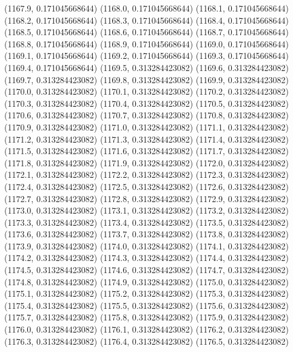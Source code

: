 {					(1167.9, 0.171045668644)
					(1168.0, 0.171045668644)
					(1168.1, 0.171045668644)
					(1168.2, 0.171045668644)
					(1168.3, 0.171045668644)
					(1168.4, 0.171045668644)
					(1168.5, 0.171045668644)
					(1168.6, 0.171045668644)
					(1168.7, 0.171045668644)
					(1168.8, 0.171045668644)
					(1168.9, 0.171045668644)
					(1169.0, 0.171045668644)
					(1169.1, 0.171045668644)
					(1169.2, 0.171045668644)
					(1169.3, 0.171045668644)
					(1169.4, 0.171045668644)
					(1169.5, 0.313284423082)
					(1169.6, 0.313284423082)
					(1169.7, 0.313284423082)
					(1169.8, 0.313284423082)
					(1169.9, 0.313284423082)
					(1170.0, 0.313284423082)
					(1170.1, 0.313284423082)
					(1170.2, 0.313284423082)
					(1170.3, 0.313284423082)
					(1170.4, 0.313284423082)
					(1170.5, 0.313284423082)
					(1170.6, 0.313284423082)
					(1170.7, 0.313284423082)
					(1170.8, 0.313284423082)
					(1170.9, 0.313284423082)
					(1171.0, 0.313284423082)
					(1171.1, 0.313284423082)
					(1171.2, 0.313284423082)
					(1171.3, 0.313284423082)
					(1171.4, 0.313284423082)
					(1171.5, 0.313284423082)
					(1171.6, 0.313284423082)
					(1171.7, 0.313284423082)
					(1171.8, 0.313284423082)
					(1171.9, 0.313284423082)
					(1172.0, 0.313284423082)
					(1172.1, 0.313284423082)
					(1172.2, 0.313284423082)
					(1172.3, 0.313284423082)
					(1172.4, 0.313284423082)
					(1172.5, 0.313284423082)
					(1172.6, 0.313284423082)
					(1172.7, 0.313284423082)
					(1172.8, 0.313284423082)
					(1172.9, 0.313284423082)
					(1173.0, 0.313284423082)
					(1173.1, 0.313284423082)
					(1173.2, 0.313284423082)
					(1173.3, 0.313284423082)
					(1173.4, 0.313284423082)
					(1173.5, 0.313284423082)
					(1173.6, 0.313284423082)
					(1173.7, 0.313284423082)
					(1173.8, 0.313284423082)
					(1173.9, 0.313284423082)
					(1174.0, 0.313284423082)
					(1174.1, 0.313284423082)
					(1174.2, 0.313284423082)
					(1174.3, 0.313284423082)
					(1174.4, 0.313284423082)
					(1174.5, 0.313284423082)
					(1174.6, 0.313284423082)
					(1174.7, 0.313284423082)
					(1174.8, 0.313284423082)
					(1174.9, 0.313284423082)
					(1175.0, 0.313284423082)
					(1175.1, 0.313284423082)
					(1175.2, 0.313284423082)
					(1175.3, 0.313284423082)
					(1175.4, 0.313284423082)
					(1175.5, 0.313284423082)
					(1175.6, 0.313284423082)
					(1175.7, 0.313284423082)
					(1175.8, 0.313284423082)
					(1175.9, 0.313284423082)
					(1176.0, 0.313284423082)
					(1176.1, 0.313284423082)
					(1176.2, 0.313284423082)
					(1176.3, 0.313284423082)
					(1176.4, 0.313284423082)
					(1176.5, 0.313284423082)
}
